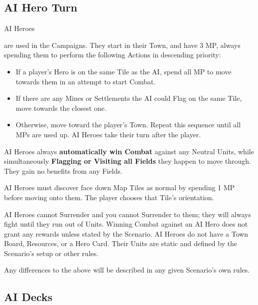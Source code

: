 
\begin{multicols}{2}

\subsection*{AI Hero Turn}
\hypertarget{AIrules}{AI Heroes} are used in the Campaigns.
They start in their Town, and have 3 MP, always spending them to perform the following Actions in descending priority:
\begin{itemize}
  \item If a player's Hero is on the same Tile as the AI, spend all MP to move towards them in an attempt to start Combat.
  \item If there are any Mines or Settlements the AI could Flag on the same Tile, move towards the closest one.
  \item Otherwise, move toward the player's Town.
Repeat this sequence until all MPs are used up.
AI Heroes take their turn after the player.
\end{itemize}

AI Heroes always \textbf{automatically win Combat} against any Neutral Units, while simultaneously \textbf{Flagging or Visiting all Fields} they happen to move through.
They gain no benefits from any Fields.

AI Heroes must discover face down Map Tiles as normal by spending 1 MP before moving onto them.
The player chooses that Tile's orientation.\par
AI Heroes cannot Surrender and you cannot Surrender to them;
they will always fight until they run out of Units.
Winning Combat against an AI Hero does not grant any rewards unless stated by the Scenario.
AI Heroes do not have a Town Board, Resources, or a Hero Card.
Their Units are static and defined by the Scenario's setup or other rules.\par
Any differences to the above will be described in any given Scenario's own rules.

\vfill

\subsection*{AI Decks}


\end{multicols}
